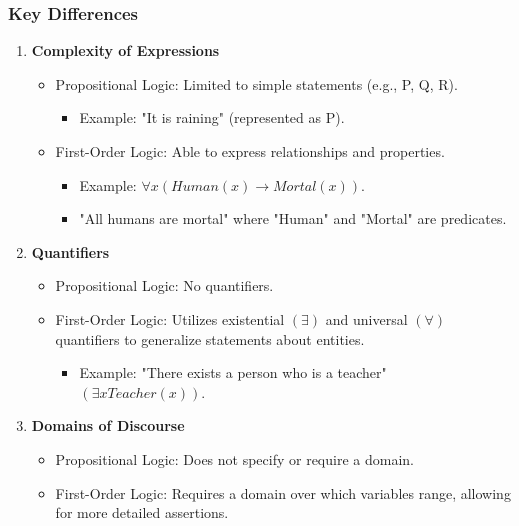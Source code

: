 \documentclass[aspectratio=169]{beamer}
\begin{document}
\begin{frame}[fragile]
  \frametitle{Key Differences}
  \begin{enumerate}
    \item \textbf{Complexity of Expressions}
      \begin{itemize}
        \item Propositional Logic: Limited to simple statements (e.g., P, Q, R).
          \begin{itemize}
            \item Example: "It is raining" (represented as P).
          \end{itemize}
        \item First-Order Logic: Able to express relationships and properties.
          \begin{itemize}
            \item Example: $\forall x (Human(x) \rightarrow Mortal(x))$.
            \item "All humans are mortal" where "Human" and "Mortal" are predicates.
          \end{itemize}
      \end{itemize}
    
    \item \textbf{Quantifiers}
      \begin{itemize}
        \item Propositional Logic: No quantifiers.
        \item First-Order Logic: Utilizes existential $(\exists)$ and universal $(\forall)$ quantifiers to generalize statements about entities.
          \begin{itemize}
            \item Example: "There exists a person who is a teacher" $(\exists x Teacher(x))$.
          \end{itemize}
      \end{itemize}
    
    \item \textbf{Domains of Discourse}
      \begin{itemize}
        \item Propositional Logic: Does not specify or require a domain.
        \item First-Order Logic: Requires a domain over which variables range, allowing for more detailed assertions.
      \end{itemize}
  \end{enumerate}
\end{frame}
\end{document}
